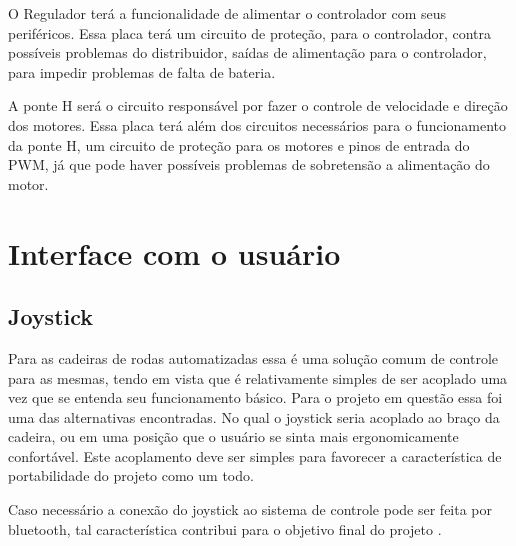 O Regulador terá a funcionalidade de alimentar o controlador com seus periféricos. Essa placa terá um circuito de proteção, para o controlador, contra possíveis problemas do distribuidor, saídas de alimentação para o controlador, para impedir problemas de falta de bateria.

A ponte H será o circuito responsável por fazer o controle de velocidade e direção dos motores. Essa placa terá além dos circuitos necessários para o funcionamento da ponte H, um circuito de proteção para os motores e pinos de entrada do PWM, já que pode haver possíveis problemas de sobretensão a alimentação do motor.

\section{Interface com o usuário}

\subsection{Joystick}

Para as cadeiras de rodas automatizadas essa é uma solução comum de controle para as mesmas, tendo em vista que é relativamente simples de ser acoplado uma vez que se entenda seu funcionamento básico. Para o projeto em questão essa foi uma das alternativas encontradas. No qual o joystick seria acoplado ao braço da cadeira, ou em uma posição que o usuário se sinta mais ergonomicamente confortável. Este acoplamento deve ser simples para favorecer a característica de portabilidade do projeto como um todo.

Caso necessário a conexão do joystick ao sistema de controle pode ser feita por bluetooth, tal característica contribui para o objetivo final do projeto \cite{artigo_joystick_controller}.
